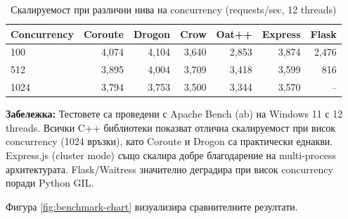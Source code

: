 \begin{table}[H]
\centering
\caption{Скалируемост при различни нива на concurrency (requests/sec, 12 threads)}
\label{tab:benchmark-concurrency}
\begin{tabular}{|l|r|r|r|r|r|r|}
\hline
\textbf{Concurrency} & \textbf{Coroute} & \textbf{Drogon} & \textbf{Crow} & \textbf{Oat++} & \textbf{Express} & \textbf{Flask} \\
\hline
100 & 4,074 & 4,104 & 3,640 & 2,853 & 3,874 & 2,476 \\
512 & 3,895 & 4,004 & 3,709 & 3,418 & 3,599 & 816 \\
1024 & 3,794 & 3,753 & 3,500 & 3,344 & 3,570 & -- \\
\hline
\end{tabular}
\end{table}

\textbf{Забележка:} Тестовете са проведени с Apache Bench (ab) на Windows 11 с 12 threads. Всички C++ библиотеки показват отлична скалируемост при висок concurrency (1024 връзки), като Coroute и Drogon са практически еднакви. Express.js (cluster mode) също скалира добре благодарение на multi-process архитектурата. Flask/Waitress значително деградира при висок concurrency поради Python GIL.

Фигура \ref{fig:benchmark-chart} визуализира сравнителните резултати.

